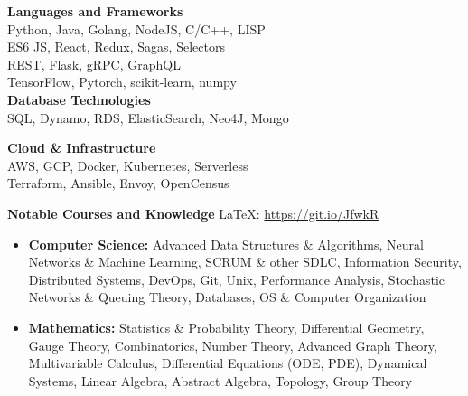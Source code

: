 \documentclass{article}
\newcommand{\centerbullet}{$\vcenter{\hbox{\tiny$\bullet$}} \ $}
\begin{document}
\begin{centering}
\vspace{-8pt}
\begin{multicols}{2}
{\bf Languages and Frameworks}\\
Python, Java, Golang, NodeJS, C/C++, LISP\\
ES6 JS, React, Redux, Sagas, Selectors \\
REST, Flask, gRPC, GraphQL  \\   
TensorFlow, Pytorch, scikit-learn, numpy\\
{ \bf Database Technologies}\\
SQL, Dynamo, RDS, ElasticSearch, Neo4J, Mongo

{\bf Cloud \& Infrastructure }\\
AWS, GCP, Docker, Kubernetes, Serverless \\
Terraform, Ansible, Envoy, OpenCensus
\end{multicols}
\end{centering}
\vspace{-10pt}
{\bf Notable Courses and Knowledge} \hfill \LaTeX: \url{https://git.io/JfwkR} 
\begin{itemize}[leftmargin=*]
\itemsep0em
\renewcommand\labelitemi{\tiny$\bullet$}
    \item {\bf{Computer Science:}} Advanced Data Structures \& Algorithms, Neural Networks \& Machine Learning, SCRUM \& other SDLC,  Information Security, Distributed Systems, DevOps, Git, Unix, Performance Analysis, Stochastic Networks \& Queuing Theory, Databases, OS \& Computer Organization
    \item {\bf{Mathematics:}} Statistics \& Probability Theory, Differential Geometry, Gauge Theory, Combinatorics, Number Theory, Advanced Graph Theory, Multivariable Calculus, Differential Equations (ODE, PDE), Dynamical Systems, Linear Algebra, Abstract Algebra, Topology, Group Theory
\end{itemize}

\end{document}

